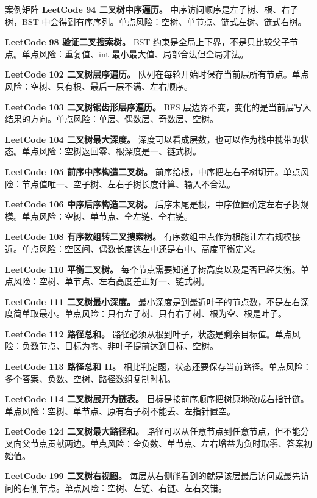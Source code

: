 \begin{principlebox}{案例矩阵}
\textbf{LeetCode 94 二叉树中序遍历。}
中序访问顺序是左子树、根、右子树，BST 中会得到有序序列。单点风险：空树、单节点、链式左树、链式右树。

\textbf{LeetCode 98 验证二叉搜索树。}
BST 约束是全局上下界，不是只比较父子节点。单点风险：重复值、int 最小最大值、局部合法但全局非法。

\textbf{LeetCode 102 二叉树层序遍历。}
队列在每轮开始时保存当前层所有节点。单点风险：空树、只有根、最后一层不满、左右顺序。

\textbf{LeetCode 103 二叉树锯齿形层序遍历。}
BFS 层边界不变，变化的是当前层写入结果的方向。单点风险：单层、偶数层、奇数层、空树。

\textbf{LeetCode 104 二叉树最大深度。}
深度可以看成层数，也可以作为栈中携带的状态。单点风险：空树返回零、根深度是一、链式树。

\textbf{LeetCode 105 前序中序构造二叉树。}
前序给根，中序把左右子树切开。单点风险：节点值唯一、空子树、左右子树长度计算、输入不合法。

\textbf{LeetCode 106 中序后序构造二叉树。}
后序末尾是根，中序位置确定左右子树规模。单点风险：空树、单节点、全左链、全右链。

\textbf{LeetCode 108 有序数组转二叉搜索树。}
有序数组中点作为根能让左右规模接近。单点风险：空区间、偶数长度选左中还是右中、高度平衡定义。

\textbf{LeetCode 110 平衡二叉树。}
每个节点需要知道子树高度以及是否已经失衡。单点风险：空树、单节点、左右高度差正好一、链式树。

\textbf{LeetCode 111 二叉树最小深度。}
最小深度是到最近叶子的节点数，不是左右深度简单取最小。单点风险：只有左子树、只有右子树、根为空、根是叶子。

\textbf{LeetCode 112 路径总和。}
路径必须从根到叶子，状态是剩余目标值。单点风险：负数节点、目标为零、非叶子提前达到目标、空树。

\textbf{LeetCode 113 路径总和 II。}
相比判定题，状态还要保存当前路径。单点风险：多个答案、负数、空树、路径数组复制时机。

\textbf{LeetCode 114 二叉树展开为链表。}
目标是按前序顺序把树原地改成右指针链。单点风险：空树、单节点、原有右子树不能丢、左指针置空。

\textbf{LeetCode 124 二叉树最大路径和。}
路径可以从任意节点到任意节点，但不能分叉向父节点贡献两边。单点风险：全负数、单节点、左右增益为负时取零、答案初始值。

\textbf{LeetCode 199 二叉树右视图。}
每层从右侧能看到的就是该层最后访问或最先访问的右侧节点。单点风险：空树、左链、右链、左右交错。


\end{principlebox}
